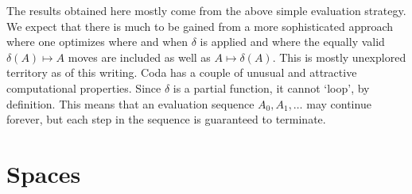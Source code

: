 \documentclass[11pt]{article}
\begin{document}
    The results obtained here mostly come from the above simple evaluation strategy.
We expect that there is much to be gained from a more sophisticated approach 
where one optimizes where and when $\delta$ is applied and where the equally valid $\delta(A)\mapsto A$ moves are included as well
as $A\mapsto\delta(A)$.  This is mostly unexplored territory as of this writing.  Coda has a couple of unusual and attractive computational properties.
Since $\delta$ is a partial function, it cannot `loop', by definition.  This means that an evaluation sequence $A_0,A_1,\dots$ may continue forever,
but each step in the sequence is guaranteed to terminate.  

\section{Spaces}
\end{document}
